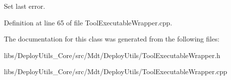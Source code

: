 Set last error. 



Definition at line 65 of file Tool\+Executable\+Wrapper.\+cpp.



The documentation for this class was generated from the following files\+:\begin{DoxyCompactItemize}
\item 
libs/\+Deploy\+Utils\+\_\+\+Core/src/\+Mdt/\+Deploy\+Utils/Tool\+Executable\+Wrapper.\+h\item 
libs/\+Deploy\+Utils\+\_\+\+Core/src/\+Mdt/\+Deploy\+Utils/Tool\+Executable\+Wrapper.\+cpp\end{DoxyCompactItemize}
